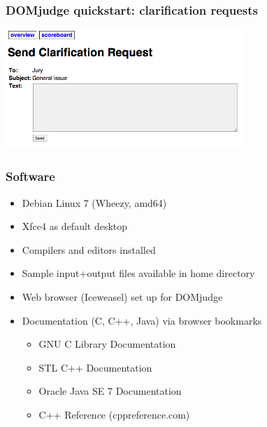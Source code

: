 \documentclass[t]{beamer}
\begin{document}
\begin{frame}
	\frametitle{DOMjudge quickstart: clarification requests}
	\includegraphics[width=90mm]{clarreq.png}
\end{frame}
\begin{frame}
	\frametitle{Software}
	\begin{itemize}
	\item Debian Linux 7 (Wheezy, amd64)
	\end{itemize}
	\begin{itemize}
		\item Xfce4 as default desktop
		\item Compilers and editors installed
		\item Sample input+output files available in home directory
		\item Web browser (Iceweasel) set up for DOMjudge
	\item Documentation (C, C++, Java) via browser bookmarks
		\begin{itemize}
			\item GNU C Library Documentation
			\item STL C++ Documentation
			\item Oracle Java SE 7 Documentation
			\item C++ Reference (cppreference.com)
		\end{itemize}
	\end{itemize}
\end{frame}
\end{document}
